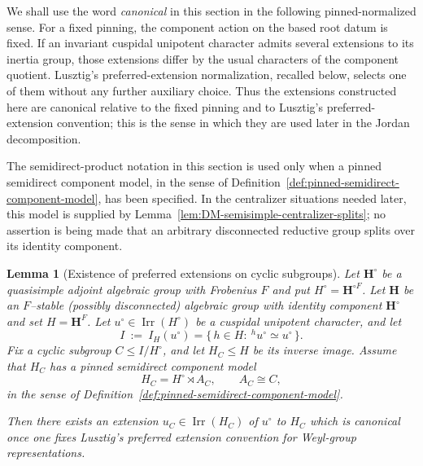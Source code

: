 \documentclass{amsart}
\theoremstyle{plain}
\numberwithin{equation}{section}
\newtheorem{lemma}[theorem]{Lemma}
\theoremstyle{definition}
\newcommand{\Irr}{\operatorname{Irr}}
\begin{document}
We shall use the word \emph{canonical} in this section in the following
pinned-normalized sense.  For a fixed pinning, the component action on the based
root datum is fixed.  If an invariant cuspidal unipotent character admits
several extensions to its inertia group, those extensions differ by the usual
characters of the component quotient.  Lusztig's preferred-extension
normalization, recalled below, selects one of them without any further auxiliary
choice.  Thus the extensions constructed here are canonical relative to the
fixed pinning and to Lusztig's preferred-extension convention; this is the sense
in which they are used later in the Jordan decomposition.

The semidirect-product notation in this section is used only when a pinned
semidirect component model, in the sense of
Definition~\ref{def:pinned-semidirect-component-model}, has been specified.  In
the centralizer situations needed later, this model is supplied by
Lemma~\ref{lem:DM-semisimple-centralizer-splits}; no assertion is being made
that an arbitrary disconnected reductive group splits over its identity
component.

\begin{lemma}[Existence of preferred extensions on cyclic subgroups]
\label{lem:cyclic-preferred-extension}
Let $\mathbf H^\circ$ be a quasisimple adjoint algebraic group with Frobenius $F$ and put
$H^\circ=\mathbf H^{\circ F}$. Let $\mathbf H$ be an $F$--stable (possibly disconnected) algebraic
group with identity component $\mathbf H^\circ$ and set $H=\mathbf H^F$.
Let $u^\circ\in\Irr(H^\circ)$ be a cuspidal unipotent character, and let
\[
I \ :=\ I_H(u^\circ)=\{\,h\in H:\ {}^h u^\circ\simeq u^\circ\,\}.
\]
Fix a cyclic subgroup $C\le I/H^\circ$, and let $H_C\le H$ be its inverse image.
Assume that $H_C$ has a pinned semidirect component model
\[
        H_C=H^\circ\rtimes A_C,
        \qquad A_C\cong C,
\]
in the sense of Definition~\ref{def:pinned-semidirect-component-model}.

Then there exists an extension $u_C\in\Irr(H_C)$ of $u^\circ$ to $H_C$ which is
canonical once one fixes Lusztig's preferred extension convention for Weyl-group representations.
\end{lemma}
\end{document}
